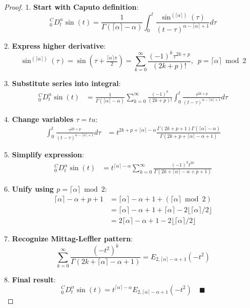\documentclass{article}
\begin{document}
\begin{proof}
1. \textbf{Start with Caputo definition}:
\begin{equation}
_0^CD_t^\alpha \sin(t) = \frac{1}{\Gamma(\lceil\alpha\rceil-\alpha)} \int_0^t \frac{\sin^{(\lceil\alpha\rceil)}(\tau)}{(t-\tau)^{\alpha-\lceil\alpha\rceil+1}} d\tau
\end{equation}

2. \textbf{Express higher derivative}:
\begin{equation}
\sin^{(\lceil\alpha\rceil)}(\tau) = \sin\left(\tau + \tfrac{\lceil\alpha\rceil\pi}{2}\right) = \sum_{k=0}^\infty \frac{(-1)^k \tau^{2k+p}}{(2k+p)!}, \enspace p = \lceil\alpha\rceil \bmod 2
\end{equation}

3. \textbf{Substitute series into integral}:
\begin{align}
_0^CD_t^\alpha \sin(t) &= \frac{1}{\Gamma(\lceil\alpha\rceil-\alpha)} \sum_{k=0}^\infty \frac{(-1)^k}{(2k+p)!} \int_0^t \frac{\tau^{2k+p}}{(t-\tau)^{\alpha-\lceil\alpha\rceil+1}} d\tau
\end{align}

4. \textbf{Change variables $\tau = tu$}:
\begin{align}
\int_0^t \frac{\tau^{2k+p}}{(t-\tau)^{\alpha-\lceil\alpha\rceil+1}} d\tau &= t^{2k+p+\lceil\alpha\rceil-\alpha} \frac{\Gamma(2k+p+1)\Gamma(\lceil\alpha\rceil-\alpha)}{\Gamma(2k+p+\lceil\alpha\rceil-\alpha+1)}
\end{align}

5. \textbf{Simplify expression}:
\begin{align}
_0^CD_t^\alpha \sin(t) &= t^{\lceil\alpha\rceil-\alpha} \sum_{k=0}^\infty \frac{(-1)^k t^{2k}}{\Gamma(2k + \lceil\alpha\rceil - \alpha + p + 1)}
\end{align}

6. \textbf{Unify using $p = \lceil\alpha\rceil \bmod 2$}:
\begin{align}
\lceil\alpha\rceil-\alpha+p+1 &= \lceil\alpha\rceil-\alpha+1+(\lceil\alpha\rceil \bmod 2) \\
&= \lceil\alpha\rceil-\alpha+1+\lceil\alpha\rceil-2\lfloor\lceil\alpha\rceil/2\rfloor \\
&= 2\lceil\alpha\rceil-\alpha+1-2\lfloor\lceil\alpha\rceil/2\rfloor
\end{align}

7. \textbf{Recognize Mittag-Leffler pattern}:
\begin{equation}
\sum_{k=0}^\infty \frac{(-t^2)^k}{\Gamma(2k + \lceil\alpha\rceil - \alpha + 1)} = E_{2,\lceil\alpha\rceil-\alpha+1}(-t^2)
\end{equation}

8. \textbf{Final result}:
\begin{equation}
_0^CD_t^\alpha \sin(t) = t^{\lceil\alpha\rceil-\alpha} E_{2,\lceil\alpha\rceil-\alpha+1}(-t^2) \quad \blacksquare
\end{equation}
\end{proof}
\end{document}
